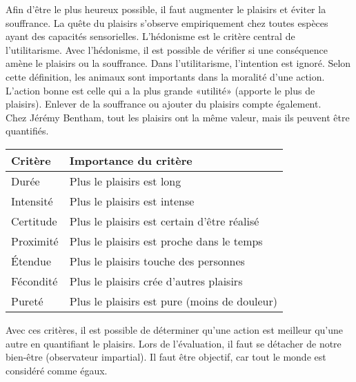 \documentclass[11pt]{article}
\begin{document}
Afin d'être le plus heureux possible, il faut augmenter le plaisirs et éviter la souffrance. La quête du plaisirs s'observe empiriquement chez toutes espèces ayant des capacités sensorielles. L'hédonisme est le critère central de l'utilitarisme.
Avec l'hédonisme, il est possible de vérifier si une conséquence amène le plaisirs ou la souffrance. Dans l'utilitarisme, l'intention est ignoré.
Selon cette définition, les animaux sont importants dans la moralité d'une action. L'action bonne est celle qui a la plus grande «utilité» (apporte le plus de plaisirs). Enlever de la souffrance ou ajouter du plaisirs compte également.\\

Chez Jérémy Bentham, tout les plaisirs ont la même valeur, mais ils peuvent être quantifiés.

\begin{center}
\begin{tabular}{@{}ll@{}}
\hline
  \textbf{Critère}
& \textbf{Importance du critère}\\
\hline
  Durée
& Plus le plaisirs est long\\
  Intensité
& Plus le plaisirs est intense\\
  Certitude
& Plus le plaisirs est certain d'être réalisé\\
  Proximité
& Plus le plaisirs est proche dans le temps\\
  Étendue
& Plus le plaisirs touche des personnes\\
  Fécondité
& Plus le plaisirs crée d'autres plaisirs\\
  Pureté
& Plus le plaisirs est pure (moins de douleur)\\
\hline
\end{tabular}
\end{center}

Avec ces critères, il est possible de déterminer qu'une action est meilleur qu'une autre en quantifiant le plaisirs. Lors de l'évaluation, il faut se détacher de notre bien-être (observateur impartial). Il faut être objectif, car tout le monde est considéré comme égaux.\pagebreak
\end{document}
